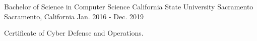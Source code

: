 

\begin{cventries}

  \cventry
    {Bachelor of Science in Computer Science} %
    {California State University Sacramento} %
    {Sacramento, California} %
	  {Jan. 2016 - Dec. 2019} %
    {
      \begin{cvitems} %
        \item {Certificate of Cyber Defense and Operations.}
      \end{cvitems}
    }

\end{cventries}
